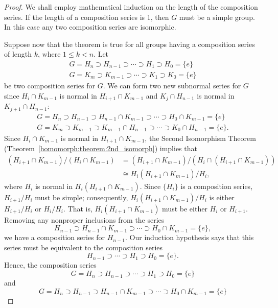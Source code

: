  
\begin{proof}
We shall employ mathematical induction on the length of the
composition series.  If the length of a composition series is 1, 
then $G$ must be a simple group.  In this case any two composition
series are isomorphic.
 
 
Suppose now that the theorem is true for all groups having a
composition series of length $k$, where $1 \leq k < n$. Let 
\begin{gather*}
G = H_n \supset H_{n-1} \supset \cdots \supset H_1 \supset
H_0 = \{ e \} \\
G = K_m \supset K_{m-1} \supset \cdots \supset K_1 \supset
K_0 = \{ e \}
\end{gather*}
be two composition series for $G$.  We can form two new subnormal
series for $G$ since $H_i \cap K_{m-1}$ is normal in $H_{i+1} \cap
K_{m-1}$ and $K_j \cap H_{n-1}$ is normal in $K_{j+1} \cap H_{n-1}$:
\begin{gather*}
G = H_n \supset H_{n-1} \supset H_{n-1} \cap K_{m-1} \supset 
\cdots \supset H_0 \cap K_{m-1} = \{ e \} \\
G = K_m \supset K_{m-1} \supset K_{m-1} \cap H_{n-1} \supset 
\cdots \supset K_0 \cap H_{n-1} = \{ e \}.
\end{gather*}
Since $H_i \cap K_{m-1}$ is normal in $H_{i+1} \cap K_{m-1}$, the
Second Isomorphism Theorem (Theorem~\ref{homomorph:theorem:2nd_isomorph}) implies that 
\begin{align*}
(H_{i+1} \cap K_{m-1}) / (H_i \cap K_{m-1}) 
& =  (H_{i+1} \cap K_{m-1}) / (H_i \cap ( H_{i+1} \cap K_{m-1} )) \\
& \cong  H_i (H_{i+1} \cap K_{m-1})/ H_i,
\end{align*}
where $H_i$ is normal in $H_i (H_{i+1} \cap K_{m-1})$. Since $\{ H_i
\}$  is a composition series, $H_{i+1} / H_i$ must be simple;
consequently, $H_i (H_{i+1} \cap K_{m-1})/ H_i$ is either $H_{i+1}/
H_i$ or $H_i/H_i$.  That is, $H_i (H_{i+1} \cap K_{m-1})$ must be
either $H_i$ or $H_{i+1}$. Removing any nonproper inclusions from the
series 
\[
H_{n-1} \supset H_{n-1} \cap K_{m-1} \supset 
\cdots \supset H_0 \cap K_{m-1} = \{ e \}, 
\]
we have a composition series for $H_{n-1}$. Our induction hypothesis
says that this series must be equivalent to the composition series
\[
H_{n-1} \supset \cdots \supset H_1 \supset H_0 = \{ e \}.
\]
Hence, the composition series
\[
G = H_n \supset H_{n-1} \supset \cdots \supset H_1 \supset
H_0 = \{ e \} 
\]
and 
\[
G = H_n \supset H_{n-1} \supset H_{n-1} \cap K_{m-1} \supset 
\cdots \supset H_0 \cap K_{m-1} = \{ e \} 
\]
\end{proof}
